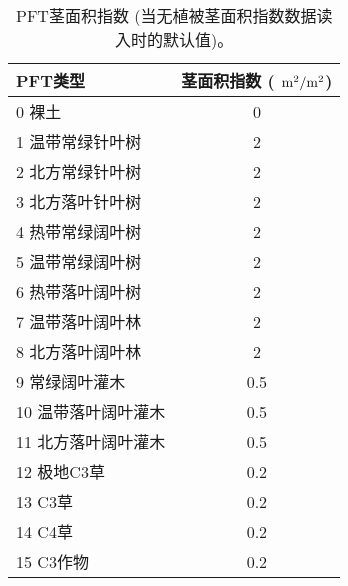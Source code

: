 \begin{table}[]
    \centering
    \caption{PFT茎面积指数 (当无植被茎面积指数数据读入时的默认值)。}
    \label{tab:PFT茎面积指数}
    \begin{tabular}{@{}lc@{}}
    \toprule
    PFT类型       & 茎面积指数 ( $\rm m^2/m^2$) \\ \midrule
    0 裸土        & 0              \\
    1 温带常绿针叶树   & 2              \\
    2 北方常绿针叶树   & 2              \\
    3 北方落叶针叶树   & 2              \\
    4 热带常绿阔叶树   & 2              \\
    5 温带常绿阔叶树   & 2              \\
    6 热带落叶阔叶树   & 2              \\
    7 温带落叶阔叶林   & 2              \\
    8 北方落叶阔叶林   & 2              \\
    9 常绿阔叶灌木    & 0.5            \\
    10 温带落叶阔叶灌木 & 0.5            \\
    11 北方落叶阔叶灌木 & 0.5            \\
    12 极地C3草    & 0.2            \\
    13 C3草      & 0.2            \\
    14 C4草      & 0.2            \\
    15 C3作物     & 0.2            \\ \bottomrule
    \end{tabular}
\end{table}


